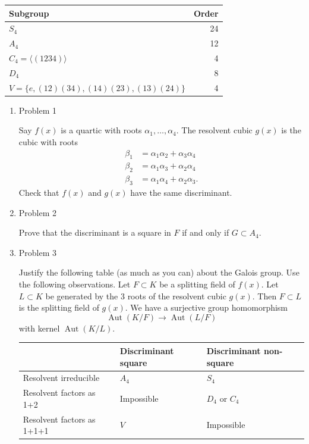\documentclass[11pt]{article}
\begin{document}
\begin{center}
\begin{tabular}{lr}
Subgroup & Order\\
\hline
\(S_4\) & 24\\
\(A_4\) & 12\\
\(C_4 = \langle (1234) \rangle\) & 4\\
\(D_4\) & 8\\
\(V = \{e,(12)(34), (14)(23), (13)(24) \}\) & 4\\
\hline
\end{tabular}
\end{center}
\begin{enumerate}
\item Problem 1
\label{sec:org3e2ba52}

Say \(f(x)\) is a quartic with roots \(\alpha_1, \dots, \alpha_4\).
The resolvent cubic \(g(x)\) is the cubic with roots 
\begin{align*}
\beta_1 &= \alpha_1\alpha_2 + \alpha_3\alpha_4\\
\beta_2 &= \alpha_1\alpha_3 + \alpha_2\alpha_4\\
\beta_3 &= \alpha_1\alpha_4 + \alpha_2\alpha_3.
\end{align*}
Check that \(f(x)\) and \(g(x)\) have the same discriminant.
\item Problem 2
\label{sec:org89be3c0}

Prove that the discriminant is a square in \(F\) if and only if \(G \subset A_4\).
\item Problem 3
\label{sec:orgb91b06d}

Justify the following table (as much as you can) about the Galois group.
Use the following observations.
Let \(F \subset K\) be a splitting field of \(f(x)\).
Let \(L \subset K\) be generated by the 3 roots of the resolvent cubic \(g(x)\).
Then \(F \subset L\) is the splitting field of \(g(x)\).
We have a surjective group homomorphism
\[ \operatorname{Aut}(K/F) \to \operatorname{Aut}(L/F)\]
with kernel \(\operatorname{Aut}(K/L)\).


\begin{center}
\begin{tabular}{lll}
 & Discriminant square & Discriminant non-square\\
\hline
Resolvent irreducible & \(A_4\) & \(S_4\)\\
Resolvent factors as 1+2 & Impossible & \(D_4\) or \(C_4\)\\
Resolvent factors as 1+1+1 & \(V\) & Impossible\\
\hline
\end{tabular}
\end{center}
\end{enumerate}
\end{document}
